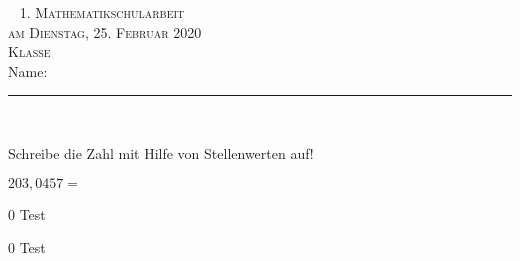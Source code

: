 \documentclass[a4paper,12pt]{report}
\begin{document}
\begin{titlepage}
\flushright
~\vfil 
\textsc{\Huge 1. Mathematikschularbeit} \\ 
[1cm] 
\textsc{\Large am Dienstag, 25. Februar 2020}\\ [1cm] 
\textsc{\Large Klasse } \\ [1cm] 
\Large Name: \rule{8cm}{0.4pt} \\ 
\vfil\vfil\vfil 
\end{titlepage}

\begin{beispiel}{0}
				Schreibe die Zahl mit Hilfe von Stellenwerten auf!\leer
					
					$203,0457=$ 

\end{beispiel}

\begin{langesbeispiel} \item[0]
Test

\end{langesbeispiel}

\begin{langesbeispiel} \item[0]
Test

\end{langesbeispiel}



\end{document}
